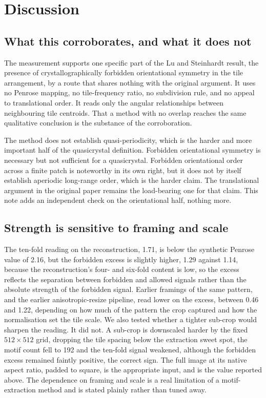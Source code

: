 \documentclass[11pt]{article}
\begin{document}
\section{Discussion}

\subsection{What this corroborates, and what it does not}

The measurement supports one specific part of the Lu and Steinhardt result, the
presence of crystallographically forbidden orientational symmetry in the tile
arrangement, by a route that shares nothing with the original argument. It uses
no Penrose mapping, no tile-frequency ratio, no subdivision rule, and no appeal
to translational order. It reads only the angular relationships between
neighbouring tile centroids. That a method with no overlap reaches the same
qualitative conclusion is the substance of the corroboration.

The method does not establish quasi-periodicity, which is the harder and more
important half of the quasicrystal definition. Forbidden orientational symmetry
is necessary but not sufficient for a quasicrystal. Forbidden orientational
order across a finite patch is noteworthy in its own right, but it does not by
itself establish aperiodic long-range order, which is the harder claim. The translational argument in the original paper remains the
load-bearing one for that claim. This note adds an independent check on the
orientational half, nothing more.

\subsection{Strength is sensitive to framing and scale}

The ten-fold reading on the reconstruction, 1.71, is below the synthetic Penrose
value of 2.16, but the forbidden excess is slightly higher, 1.29 against 1.14,
because the reconstruction's four- and six-fold content is low, so the excess
reflects the separation between forbidden and allowed signals rather than the
absolute strength of the forbidden signal. Earlier framings of the same pattern,
and the earlier anisotropic-resize pipeline, read lower on the excess, between
0.46 and 1.22, depending on how much of the pattern the crop captured and how
the normalisation set the tile scale. We also tested whether a tighter sub-crop
would sharpen the reading. It did not. A sub-crop is downscaled harder by the
fixed $512 \times 512$ grid, dropping the tile spacing below the extraction
sweet spot, the motif count fell to 192 and the ten-fold signal weakened,
although the forbidden excess remained faintly positive, the correct sign. The
full image at its native aspect ratio, padded to square, is the appropriate
input, and is the value reported above. The dependence on framing and scale is a
real limitation of a motif-extraction method and is stated plainly rather than
tuned away.
\end{document}
